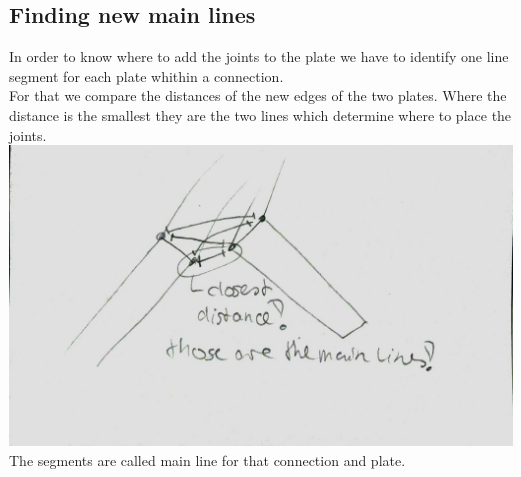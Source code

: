 \documentclass[../ClassicThesis.tex]{subfiles}
\begin{document}
\subsection{Finding new main lines}\label{mainLine}
In order to know where to add the joints to the plate we have to identify one line segment for each plate whithin a connection.\\
For that we compare the distances of the new edges of the two plates. Where the distance is the smallest they are the two lines which determine where to place the joints.\\
\includegraphics[width=.5\columnwidth, angle=90]{Images/06-1-graph-mainLinesAfterClipping.jpg}\\
The segments are called main line for that connection and plate.
\end{document}
